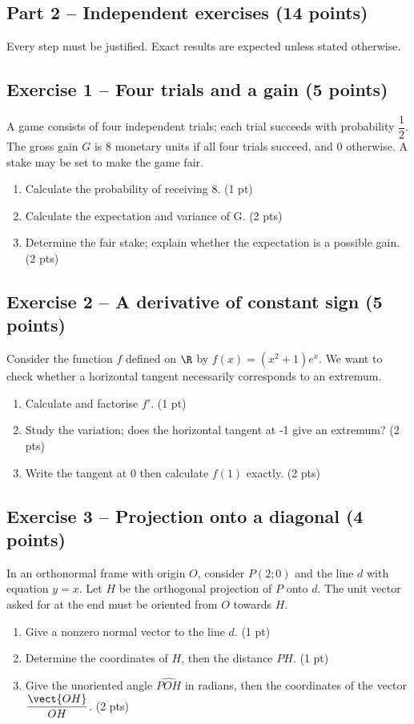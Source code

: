 \mxnewpage\subsection*{Part 2 -- Independent exercises (14 points)}
Every step must be justified. Exact results are expected unless stated otherwise.
\subsection*{Exercise 1 -- Four trials and a gain (5 points)}
A game consists of four independent trials; each trial succeeds with probability $\dfrac12$. The gross gain $G$ is 8 monetary units if all four trials succeed, and 0 otherwise. A stake may be set to make the game fair.
\begin{enumerate}
\item Calculate the probability of receiving 8. \hfill(1 pt)
\item Calculate the expectation and variance of G. \hfill(2 pts)
\item Determine the fair stake; explain whether the expectation is a possible gain. \hfill(2 pts)
\end{enumerate}
\subsection*{Exercise 2 -- A derivative of constant sign (5 points)}
Consider the function $f$ defined on $\R$ by $f(x)=(x^2+1)e^x$. We want to check whether a horizontal tangent necessarily corresponds to an extremum.
\begin{enumerate}
\item Calculate and factorise $f\prime$. \hfill(1 pt)
\item Study the variation; does the horizontal tangent at -1 give an extremum? \hfill(2 pts)
\item Write the tangent at 0 then calculate $f(1)$ exactly. \hfill(2 pts)
\end{enumerate}
\subsection*{Exercise 3 -- Projection onto a diagonal (4 points)}
In an orthonormal frame with origin $O$, consider $P(2;0)$ and the line $d$ with equation $y=x$. Let $H$ be the orthogonal projection of $P$ onto $d$. The unit vector asked for at the end must be oriented from $O$ towards $H$.
\begin{enumerate}
\item Give a nonzero normal vector to the line $d$. \hfill(1 pt)
\item Determine the coordinates of $H$, then the distance $PH$. \hfill(1 pt)
\item Give the unoriented angle $\widehat{POH}$ in radians, then the coordinates of the vector $\dfrac{\vect{OH}}{OH}$. \hfill(2 pts)
\end{enumerate}
